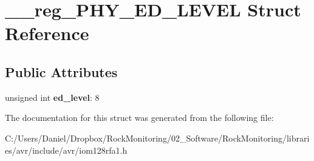 \hypertarget{struct____reg___p_h_y___e_d___l_e_v_e_l}{}\section{\+\_\+\+\_\+reg\+\_\+\+P\+H\+Y\+\_\+\+E\+D\+\_\+\+L\+E\+V\+EL Struct Reference}
\label{struct____reg___p_h_y___e_d___l_e_v_e_l}
\subsection*{Public Attributes}
\begin{DoxyCompactItemize}
\item 
unsigned int {\bfseries ed\+\_\+level}\+: 8\hypertarget{struct____reg___p_h_y___e_d___l_e_v_e_l_a1a357c41bacc95c14211850b97c6046f}{}\label{struct____reg___p_h_y___e_d___l_e_v_e_l_a1a357c41bacc95c14211850b97c6046f}

\end{DoxyCompactItemize}


The documentation for this struct was generated from the following file\+:\begin{DoxyCompactItemize}
\item 
C\+:/\+Users/\+Daniel/\+Dropbox/\+Rock\+Monitoring/02\+\_\+\+Software/\+Rock\+Monitoring/libraries/avr/include/avr/iom128rfa1.\+h\end{DoxyCompactItemize}
